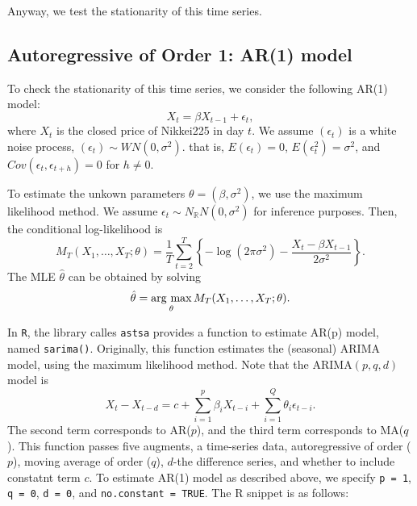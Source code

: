 \documentclass[
  12pt,
]{article}
\newenvironment{Shaded}{\begin{snugshade}}{\end{snugshade}}
\newcommand{\DataTypeTok}[1]{\textcolor[rgb]{0.13,0.29,0.53}{#1}}
\newcommand{\DecValTok}[1]{\textcolor[rgb]{0.00,0.00,0.81}{#1}}
\newcommand{\KeywordTok}[1]{\textcolor[rgb]{0.13,0.29,0.53}{\textbf{#1}}}
\newcommand{\NormalTok}[1]{#1}
\newcommand{\OperatorTok}[1]{\textcolor[rgb]{0.81,0.36,0.00}{\textbf{#1}}}
\newcommand{\OtherTok}[1]{\textcolor[rgb]{0.56,0.35,0.01}{#1}}
\newcommand{\StringTok}[1]{\textcolor[rgb]{0.31,0.60,0.02}{#1}}
\begin{document}
Anyway, we test the stationarity of this time series.

\hypertarget{autoregressive-of-order-1-ar1-model}{%
\subsection{Autoregressive of Order 1: AR(1)
model}\label{autoregressive-of-order-1-ar1-model}}

To check the stationarity of this time series, we consider the following
AR(1) model: \[ X_t = \beta X_{t-1} + \epsilon_t, \] where \(X_t\) is
the closed price of Nikkei225 in day \(t\). We assume \((\epsilon_t)\)
is a white noise process, \((\epsilon_t) \sim WN(0, \sigma^2)\). that
is, \(E(\epsilon_t) = 0\), \(E(\epsilon_t^2) = \sigma^2\), and
\(Cov(\epsilon_t, \epsilon_{t+h}) = 0\) for \(h \not= 0\).

To estimate the unkown parameters \(\theta = (\beta, \sigma^2)\), we use
the maximum likelihood method. We assume
\(\epsilon_t \sim N_{\mathbb{R}}N(0, \sigma^2)\) for inference purposes.
Then, the conditional log-likelihood is \[
  M_T(X_1, \ldots, X_T; \theta) 
  = \frac{1}{T} \sum_{t=2}^T \left\{ -\log(2\pi\sigma^2) - \frac{X_t - \beta X_{t-1}}{2\sigma^2} \right\}.
\] The MLE \(\hat{\theta}\) can be obtained by solving
\[ \hat{\theta} = \mathop{\rm arg~max}\limits_{\theta} M_T(X_1, \ldots, X_T; \theta). \]

In \texttt{R}, the library calles \texttt{astsa} provides a function to
estimate AR(p) model, named \texttt{sarima()}. Originally, this function
estimates the (seasonal) ARIMA model, using the maximum likelihood
method. Note that the ARIMA\((p, q, d)\) model is
\[ X_t - X_{t-d} = c + \sum_{i=1}^{p} \beta_i X_{t-i} + \sum_{i=1}^Q \theta_i \epsilon_{t-i}. \]
The second term corresponds to AR(\(p\)), and the third term corresponds
to MA(\(q\)). This function passes five augments, a time-series data,
autoregressive of order (\(p\)), moving average of order (\(q\)),
\(d\)-the difference series, and whether to include constatnt term
\(c\). To estimate AR(1) model as described above, we specify
\texttt{p\ =\ 1}, \texttt{q\ =\ 0}, \texttt{d\ =\ 0}, and
\texttt{no.constant\ =\ TRUE}. The R snippet is as follows:

\begin{Shaded}
\end{Shaded}
\end{document}
